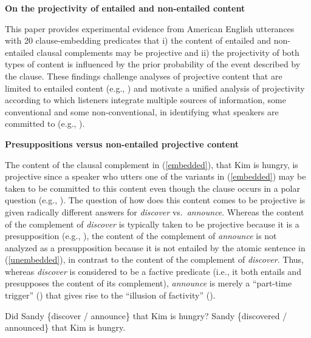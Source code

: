 \documentclass[12pt]{article}
\newcommand{\6}{\mbox{$[\hspace*{-.6mm}[$}}
\newcommand{\9}{\mbox{$]\hspace*{-.6mm}]$}}
\begin{document}
 
 
\begin{center}
{\large \bf On the projectivity of entailed and non-entailed content}
\end{center}

This paper provides experimental evidence from American English utterances with 20 clause-embedding predicates that i) the content of entailed and non-entailed clausal complements may be projective and ii) the projectivity of both types of content is influenced by the prior probability of the event described by the clause. These findings challenge analyses of projective content that are limited to entailed content (e.g., \citealt{heim83,vds92}) and motivate a unified analysis of projectivity according to which listeners integrate multiple sources of information, some conventional and some non-conventional, in identifying what speakers are committed to (e.g., \citealt{brst-salt10,brst-ar,abrusan2011,abrusan2013,tbd-variability}). 

{\bf Presuppositions versus non-entailed projective content} 

The content of the clausal complement in (\ref{embedded}), that Kim is hungry, is projective since a speaker who utters one of the variants in (\ref{embedded}) may be taken to be committed to this content even though the clause occurs in a polar question (e.g., \citealt{ccmg90,brst-salt10}). The question of how does this content comes to be projective is given radically different answers for {\em discover} vs.\ {\em announce}. Whereas the content of the complement of {\em discover} is typically taken to be projective because it is a presupposition (e.g., \citealt{heim83,vds92}), the content of the complement of {\em announce} is not analyzed as a presupposition because it is not entailed by the atomic sentence in (\ref{unembedded}), in contrast to the content of the complement of {\em discover}. Thus, whereas {\em discover} is considered to be a factive predicate (i.e., it both entails and presupposes the content of its complement), {\em announce} is merely a ``part-time trigger'' (\citealt[139]{schlenker10}) that gives rise to the ``illusion of factivity'' (\citealt[76]{anand-hacquard2014}).

\vspace*{-.2cm}
\begin{exe}
\ex
\begin{xlist}
\ex\label{embedded} Did Sandy \{discover / announce\} that Kim is hungry?
\ex\label{unembedded} Sandy \{discovered / announced\} that Kim is hungry.
\end{xlist}
\end{exe}
\vspace*{-.2cm}
\end{document}
